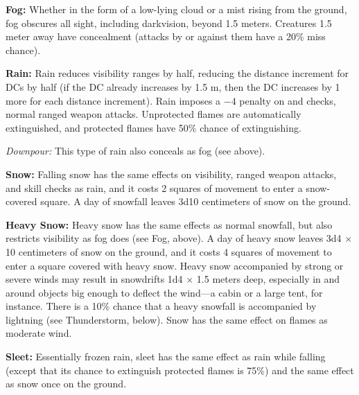 \textbf{Fog:} Whether in the form of a low-lying cloud or a mist rising from the ground, fog obscures all sight, including darkvision, beyond 1.5 meters. Creatures 1.5 meter away have concealment (attacks by or against them have a 20\% miss chance).

\textbf{Rain:} Rain reduces visibility ranges by half, reducing the distance increment for  DCs by half (if the DC already increases by 1.5 m, then the DC increases by 1 more for each distance increment). Rain imposes a $-4$ penalty on  and  checks, normal ranged weapon attacks. Unprotected flames are automatically extinguished, and protected flames have 50\% chance of extinguishing.%

\textit{Downpour:} This type of rain also conceals as fog (see above).

\textbf{Snow:} Falling snow has the same effects on visibility, ranged weapon attacks, and skill checks as rain, and it costs 2 squares of movement to enter a snow-covered square. A day of snowfall leaves 3d10 centimeters of snow on the ground.

\textbf{Heavy Snow:} Heavy snow has the same effects as normal snowfall, but also restricts visibility as fog does (see Fog, above). A day of heavy snow leaves 3d4 $\times$ 10 centimeters of snow on the ground, and it costs 4 squares of movement to enter a square covered with heavy snow. Heavy snow accompanied by strong or severe winds may result in snowdrifts 1d4 $\times$ 1.5 meters deep, especially in and around objects big enough to deflect the wind---a cabin or a large tent, for instance. There is a 10\% chance that a heavy snowfall is accompanied by lightning (see Thunderstorm, below). Snow has the same effect on flames as moderate wind.

\textbf{Sleet:} Essentially frozen rain, sleet has the same effect as rain while falling (except that its chance to extinguish protected flames is 75\%) and the same effect as snow once on the ground.


